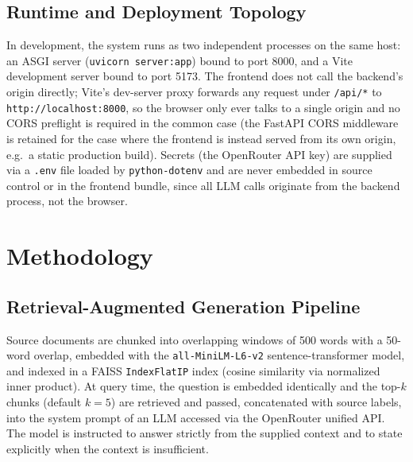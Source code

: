 \documentclass[conference]{IEEEtran}
\begin{document}
\subsection{Runtime and Deployment Topology}

In development, the system runs as two independent processes on the same host: an
ASGI server (\texttt{uvicorn server:app}) bound to port 8000, and a Vite development
server bound to port 5173. The frontend does not call the backend's origin directly;
Vite's dev-server proxy forwards any request under \texttt{/api/*} to
\texttt{http://localhost:8000}, so the browser only ever talks to a single origin and no
CORS preflight is required in the common case (the FastAPI CORS middleware is retained
for the case where the frontend is instead served from its own origin, e.g.\ a static
production build). Secrets (the OpenRouter API key) are supplied via a \texttt{.env}
file loaded by \texttt{python-dotenv} and are never embedded in source control or in the
frontend bundle, since all LLM calls originate from the backend process, not the browser.

\section{Methodology}

\subsection{Retrieval-Augmented Generation Pipeline}
Source documents are chunked into overlapping windows of 500 words with a 50-word
overlap, embedded with the \texttt{all-MiniLM-L6-v2} sentence-transformer model, and
indexed in a FAISS \texttt{IndexFlatIP} index (cosine similarity via normalized inner
product). At query time, the question is embedded identically and the top-$k$ chunks
(default $k{=}5$) are retrieved and passed, concatenated with source labels, into the
system prompt of an LLM accessed via the OpenRouter unified API. The model is instructed
to answer strictly from the supplied context and to state explicitly when the context is
insufficient.
\end{document}
